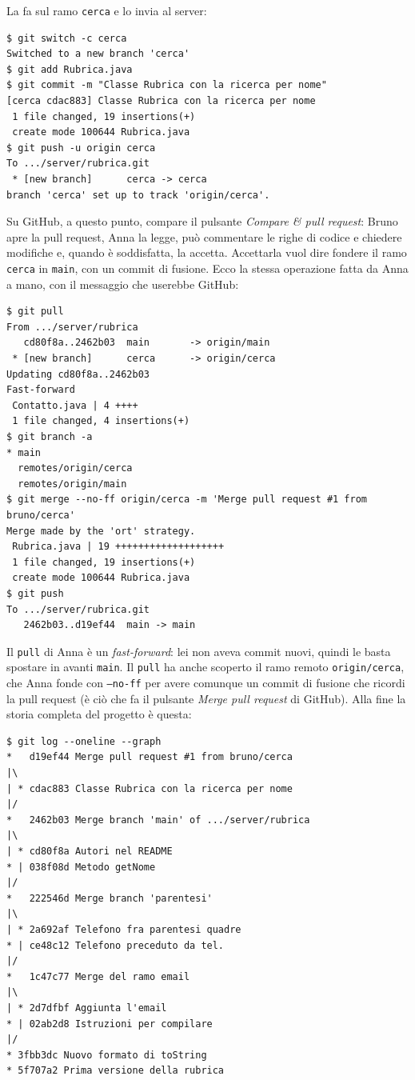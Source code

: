 La fa sul ramo \texttt{cerca} e lo invia al server:

\begin{lstlisting}[style=shell, name=Terminale di Bruno, deletestring={[b]'}, deletekeywords={java}]
$ git switch -c cerca
Switched to a new branch 'cerca'
$ git add Rubrica.java
$ git commit -m "Classe Rubrica con la ricerca per nome"
[cerca cdac883] Classe Rubrica con la ricerca per nome
 1 file changed, 19 insertions(+)
 create mode 100644 Rubrica.java
$ git push -u origin cerca
To .../server/rubrica.git
 * [new branch]      cerca -> cerca
branch 'cerca' set up to track 'origin/cerca'.
\end{lstlisting}

Su GitHub, a questo punto, compare il pulsante \textit{Compare \& pull request}: Bruno apre la pull request, Anna la
legge, può commentare le righe di codice e chiedere modifiche e, quando è soddisfatta, la accetta. Accettarla vuol dire
fondere il ramo \texttt{cerca} in \texttt{main}, con un commit di fusione. Ecco la stessa operazione fatta da Anna a
mano, con il messaggio che userebbe GitHub:

\begin{lstlisting}[style=shell, name=Terminale di Anna, deletestring={[b]'}, deletekeywords={java}, deletecomment={[l]\#}]
$ git pull
From .../server/rubrica
   cd80f8a..2462b03  main       -> origin/main
 * [new branch]      cerca      -> origin/cerca
Updating cd80f8a..2462b03
Fast-forward
 Contatto.java | 4 ++++
 1 file changed, 4 insertions(+)
$ git branch -a
* main
  remotes/origin/cerca
  remotes/origin/main
$ git merge --no-ff origin/cerca -m 'Merge pull request #1 from bruno/cerca'
Merge made by the 'ort' strategy.
 Rubrica.java | 19 +++++++++++++++++++
 1 file changed, 19 insertions(+)
 create mode 100644 Rubrica.java
$ git push
To .../server/rubrica.git
   2462b03..d19ef44  main -> main
\end{lstlisting}

Il \texttt{pull} di Anna è un \textit{fast-forward}: lei non aveva commit nuovi, quindi le basta spostare in avanti
\texttt{main}. Il \texttt{pull} ha anche scoperto il ramo remoto \texttt{origin/cerca}, che Anna fonde con
\texttt{--no-ff} per avere comunque un commit di fusione che ricordi la pull request (è ciò che fa il pulsante
\textit{Merge pull request} di GitHub). Alla fine la storia completa del progetto è questa:

\begin{lstlisting}[style=shell, name=Terminale di Anna, deletestring={[b]'}, deletekeywords={java}, deletecomment={[l]\#}]
$ git log --oneline --graph
*   d19ef44 Merge pull request #1 from bruno/cerca
|\
| * cdac883 Classe Rubrica con la ricerca per nome
|/
*   2462b03 Merge branch 'main' of .../server/rubrica
|\
| * cd80f8a Autori nel README
* | 038f08d Metodo getNome
|/
*   222546d Merge branch 'parentesi'
|\
| * 2a692af Telefono fra parentesi quadre
* | ce48c12 Telefono preceduto da tel.
|/
*   1c47c77 Merge del ramo email
|\
| * 2d7dfbf Aggiunta l'email
* | 02ab2d8 Istruzioni per compilare
|/
* 3fbb3dc Nuovo formato di toString
* 5f707a2 Prima versione della rubrica
\end{lstlisting}

